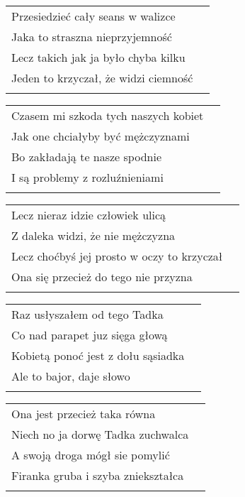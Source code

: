 \documentclass[a5paper]{article}
\begin{document}
\noindent
\begin{tabular}{@{}p{7.50cm}p{3cm}@{}}
Przesiedzieć cały seans w walizce \\
Jaka to straszna nieprzyjemność \\
Lecz takich jak ja było chyba kilku \\
Jeden to krzyczał, że widzi ciemność \\ \\
\end{tabular}

\noindent
\begin{tabular}{@{}p{7.50cm}p{3cm}@{}}
Czasem mi szkoda tych naszych kobiet \\
Jak one chciałyby być mężczyznami \\
Bo zakładają te nasze spodnie \\
I są problemy z rozluźnieniami \\ \\
\end{tabular}

\noindent
\begin{tabular}{@{}p{7.50cm}p{3cm}@{}}
Lecz nieraz idzie człowiek ulicą \\
Z daleka widzi, że nie mężczyzna \\
Lecz choćbyś jej prosto w oczy to krzyczał \\
Ona się przecież do tego nie przyzna \\ \\
\end{tabular}

\noindent
\begin{tabular}{@{}p{7.50cm}p{3cm}@{}}
Raz usłyszałem od tego Tadka \\
Co nad parapet juz sięga głową \\
Kobietą ponoć jest z dołu sąsiadka \\
Ale to bajor, daje słowo \\ \\
\end{tabular}

\noindent
\begin{tabular}{@{}p{7.50cm}p{3cm}@{}}
Ona jest przecież taka równa \\
Niech no ja dorwę Tadka zuchwalca \\
A swoją droga mógł sie pomylić \\
Firanka gruba i szyba zniekształca \\ \\
\end{tabular}
\end{document}
